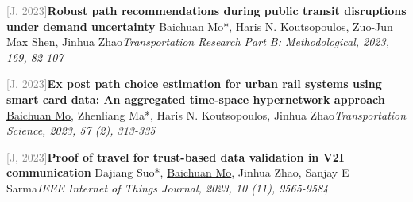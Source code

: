 \par\noindent\begin{minipage}{\linewidth}
{\textcolor{gray}{[J\themyCounter, 2023]\;}}{\textbf{Robust path recommendations during public transit disruptions under demand uncertainty} \href{https://doi.org/10.1016/j.trb.2023.02.004}{\textcolor{cadmiumorange}{\faExternalLink}}}{\newline \underline{Baichuan Mo}*, Haris N. Koutsopoulos, Zuo-Jun Max Shen, Jinhua Zhao}{\newline \emph{Transportation Research Part B: Methodological, 2023, 169, 82-107}}{{\;     }}{}
\end{minipage}\par\vspace{5.5pt}


\par\noindent\begin{minipage}{\linewidth}
{\textcolor{gray}{[J\themyCounter, 2023]\;}}{\textbf{Ex post path choice estimation for urban rail systems using smart card data: An aggregated time-space hypernetwork approach} \href{https://doi.org/10.1287/trsc.2022.1177}{\textcolor{cadmiumorange}{\faExternalLink}}}{\newline \underline{Baichuan Mo}, Zhenliang Ma*, Haris N. Koutsopoulos, Jinhua Zhao}{\newline \emph{Transportation Science, 2023, 57 (2), 313-335}}{{\;    }}{}
\end{minipage}\par\vspace{5.5pt}


\par\noindent\begin{minipage}{\linewidth}
{\textcolor{gray}{[J\themyCounter, 2023]\;}}{\textbf{Proof of travel for trust-based data validation in V2I communication} \href{https://doi.org/10.1109/JIOT.2023.3236623}{\textcolor{cadmiumorange}{\faExternalLink}}}{\newline Dajiang Suo*, \underline{Baichuan Mo}, Jinhua Zhao, Sanjay E Sarma}{\newline \emph{IEEE Internet of Things Journal, 2023, 10 (11), 9565-9584}}{{\;     }}{}
\end{minipage}\par\vspace{5.5pt}


